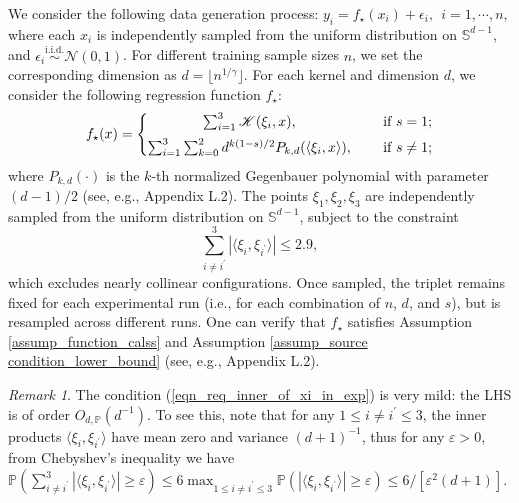\documentclass{article}
\theoremstyle{plain}
\theoremstyle{definition}
\theoremstyle{remark}
\newtheorem{remark}[theorem]{Remark}
\begin{document}
We consider the following data generation process:
$y_{i} = f_{\star}(x_{i}) + \epsilon_{i}, ~~ i = 1, \cdots, n,$ 
where each $x_{i}$ is independently sampled from the uniform distribution on $\mathbb{S}^{d-1}$, and $\epsilon_{i} \overset{\text{i.i.d.}}{\sim} \mathcal{N}(0,1)$.
%
%
For different training sample sizes $n$,  we set the corresponding dimension as $d=\lfloor n^{1/\gamma}\rfloor$. For each kernel and dimension $d$, we consider the following regression function $f_{\star}$:
\begin{equation}\label{experiment true function}
    f_{\star}(x) = 
    \left\{\begin{matrix}
\sum_{i=1}^{3} \mathscr{K}(\xi_{i},x), & \quad \text{ if } s=1; \vspace{5pt}\\
\sum_{i=1}^{3} \sum_{k=0}^{2} d^{k(1-s)/2} P_{k, d}(\langle\xi_{i}, x\rangle), & \quad \text{ if } s \neq 1;
\end{matrix}\right.
\end{equation}
where $P_{k, d}(\cdot)$ is the $k$-th normalized Gegenbauer polynomial with parameter $(d-1)/2$ (see, e.g., Appendix L.2).
%
%
The points $\xi_{1}, \xi_{2}, \xi_{3}$ are independently sampled from the uniform distribution on $\mathbb{S}^{d-1}$, subject to the constraint 
    \begin{equation}\label{eqn_req_inner_of_xi_in_exp}
        \sum_{i \neq i^{\prime}}^{3} \left| \langle \xi_{i}, \xi_{i^{\prime}} \rangle \right| \leq 2.9,
    \end{equation}
    which excludes nearly collinear configurations. 
    Once sampled, the triplet remains fixed for each experimental run (i.e., for each combination of $n$, $d$, and $s$), but is resampled across different runs. 
One can verify that $f_{\star}$ satisfies Assumption \ref{assump_function_calss} and Assumption \ref{assump_source condition_lower_bound} (see, e.g., Appendix L.2).

    

\begin{remark}
    The condition (\ref{eqn_req_inner_of_xi_in_exp}) is very mild: the LHS is of order $O_{d, \mathbb{P}}(d^{-1})$. To see this, note that for any $1 \leq i \neq i^{\prime} \leq 3$, the inner products $\langle \xi_{i}, \xi_{i^{\prime}} \rangle$ have mean zero and variance $(d+1)^{-1}$, thus for any $\varepsilon>0$, from Chebyshev's inequality we have $\mathbb{P}(\sum_{i \neq i^{\prime}}^{3} \left| \langle \xi_{i}, \xi_{i^{\prime}} \rangle \right| \geq \varepsilon) \leq 6 \max_{1 \leq i \neq i^{\prime} \leq 3} \mathbb{P}( \left| \langle \xi_{i}, \xi_{i^{\prime}} \rangle \right| \geq \varepsilon) \leq 6/[\varepsilon^2(d+1)]$. 
\end{remark}
\end{document}
